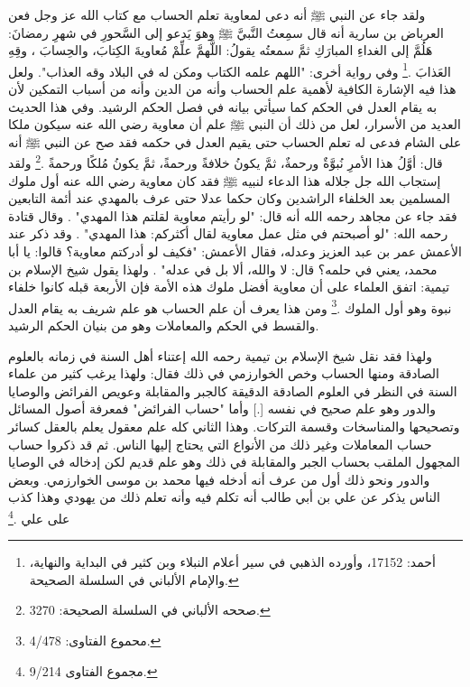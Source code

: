 ولقد جاء عن النبي ﷺ أنه دعى لمعاوية تعلم الحساب مع كتاب الله عز وجل فعن العرباض بن سارية أنه قال سمِعتُ النَّبيَّ ﷺ وهوَ يَدعو إلى السَّحورِ في شهرِ رمضانَ: هَلُمَّ إلى الغداءِ المبارَكِ ثمَّ سمعتُه يقولُ: اللَّهمَّ علِّمْ مُعاويةَ الكِتابَ، والحِسابَ ، وقِهِ العَذابَ \href{https://shamela.ws/book/25794/13683#p2}{\faExternalLink}\href{https://shamela.ws/book/22669/1909#p2}{\faExternalLink}\href{https://shamela.ws/book/4445/6628#p1}{\faExternalLink}\href{https://shamela.ws/book/9442/5496#p12}{\faExternalLink} \cite{ahmid}\cite{dahabi_Siyar}\cite{ibnKathir_AlBidayah}\cite{albani_Sahiha}.\footnote{أحمد: 17152، وأورده الذهبي في سير أعلام النبلاء وبن كثير في البداية والنهاية، والإمام الألباني في السلسلة الصحيحة.} وفي رواية أخرى: "اللهم علمه الكتاب ومكن له في البلاد وقه العذاب". ولعل هذا فيه الإشارة الكافية لأهمية علم الحساب وأنه من الدين وأنه من أسباب التمكين لأن به يقام العدل في الحكم كما سيأتي بيانه في فصل الحكم الرشيد. وفي هذا الحديث العديد من الأسرار، لعل من ذلك أن النبي ﷺ علم أن معاوية رضي الله عنه سيكون ملكا على الشام فدعى له تعلم الحساب حتى يقيم العدل في حكمه فقد صح عن النبي ﷺ أنه قال: أوَّلُ هذا الأمرِ نُبوَّةٌ ورحمةٌ، ثمَّ يكونُ خلافةً ورحمةً، ثمَّ يكونُ مُلكًا ورحمةً \href{https://shamela.ws/book/9442/5496#p12}{\faExternalLink} \cite{albani_Sahiha}.\footnote{صححه الألباني في السلسلة الصحيحة: 3270.} ولقد إستجاب الله جل جلاله هذا الدعاء لنبيه ﷺ فقد كان معاوية رضي الله عنه أول ملوك المسلمين بعد الخلفاء الراشدين وكان حكما عدلا حتى عرف بالمهدي عند أئمة التابعين فقد جاء عن مجاهد رحمه الله أنه قال: "لو رأيتم معاوية لقلتم هذا المهدي" \href{https://shamela.ws/book/1077/702#p1}{\faExternalLink}. وقال قتادة رحمه الله: "لو أصبحتم في مثل عمل معاوية لقال أكثركم: هذا المهدي" \href{https://shamela.ws/book/1077/701#p1}{\faExternalLink}. وقد ذكر عند الأعمش عمر بن عبد العزيز وعدله، فقال الأعمش: "فكيف لو أدركتم معاوية؟ قالوا: يا أبا محمد، يعني في حلمه؟ قال: لا والله، ألا بل في عدله" \href{https://shamela.ws/book/1077/700#p1}{\faExternalLink}\href{https://shamela.ws/book/927/3063#p3}{\faExternalLink}. ولهذا يقول شيخ الإسلام بن تيمية: اتفق العلماء على أن معاوية أفضل ملوك هذه الأمة فإن الأربعة قبله كانوا خلفاء نبوة وهو أول الملوك \href{https://shamela.ws/book/7289/1800#p1}{\faExternalLink} \cite{ibnTaimia_Majmoo}.\footnote{محموع الفتاوى: 4/478.} ومن هذا يعرف أن علم الحساب هو علم شريف به يقام العدل والقسط في الحكم والمعاملات وهو من بنيان الحكم الرشيد.

ولهذا فقد نقل شيخ الإسلام بن تيمية رحمه الله إعتناء أهل السنة في زمانه بالعلوم الصادقة ومنها الحساب وخص الخوارزمي في ذلك فقال: ولهذا يرغب كثير من علماء السنة في النظر في العلوم الصادقة الدقيقة كالجبر والمقابلة وعويص الفرائض والوصايا والدور وهو علم صحيح في نفسه [.] وأما "حساب الفرائض" فمعرفة أصول المسائل وتصحيحها والمناسخات وقسمة التركات. وهذا الثاني كله علم معقول يعلم بالعقل كسائر حساب المعاملات وغير ذلك من الأنواع التي يحتاج إليها الناس. ثم قد ذكروا حساب المجهول الملقب بحساب الجبر والمقابلة في ذلك وهو علم قديم لكن إدخاله في الوصايا والدور ونحو ذلك أول من عرف أنه أدخله فيها محمد بن موسى الخوارزمي. وبعض الناس يذكر عن علي بن أبي طالب أنه تكلم فيه وأنه تعلم ذلك من يهودي وهذا كذب على علي
\href{https://shamela.ws/book/7289/4478#p2}{\faExternalLink} \cite{ibnTaimia_Majmoo}.\footnote{مجموع الفتاوى 9/214.} 

